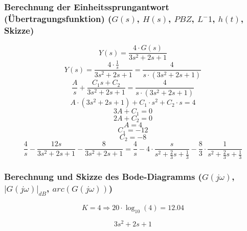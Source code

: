 \documentclass[a4paper,10pt,fleqn]{article}
\begin{document}
\subsubsection*{Berechnung der Einheitssprungantwort (Übertragungsfunktion) ($G(s)$, $H(s)$, $PBZ$, $L^-1$, $h(t)$, Skizze)}
\[ Y(s) = \frac{4 \cdot G(s)}{3 s^2 + 2 s + 1} \]
\[ Y(s) = \frac{4 \cdot \frac{1}{s}}{3 s^2 + 2 s + 1} = \frac{4}{s \cdot (3 s^2 + 2 s + 1)} \]
\[ \frac{A}{s} + \frac{C_1 s + C_2}{3 s^2 + 2 s + 1} = \frac{4}{s \cdot (3 s^2 + 2 s + 1)} \]
\[ A \cdot (3 s^2 + 2 s + 1) + C_1 \cdot s^2 + C_2 \cdot s = 4 \]
\[ 3 A + C_1 = 0 \]
\[ 2 A + C_2 = 0 \]
\[ A = 4 \]
\[ C_1 = -12 \]
\[ C_2 = -8 \]
\[ \frac{4}{s} - \frac{12 s}{3 s^2 + 2 s + 1} - \frac{8}{3 s^2 + 2 s + 1} 
= \frac{4}{s} - 4 \cdot \frac{s}{s^2 + \frac{2}{3} s + \frac{1}{3}} - \frac{8}{3} \cdot \frac{1}{s^2 + \frac{2}{3} s + \frac{1}{3}} \]

\subsubsection*{Berechnung und Skizze des Bode-Diagramms ($G(j\omega)$, $|G(j\omega)|_{dB}$, $arc(G(j\omega))$)}
\[ K = 4 \Rightarrow 20 \cdot \log_{10}(4) = 12.04 \]
\begin{figure}[h!]
    \centering
\end{figure}

\[ 3 s^2 + 2 s + 1 \]
\begin{figure}[h!]
    \centering
\end{figure}
\end{document}
